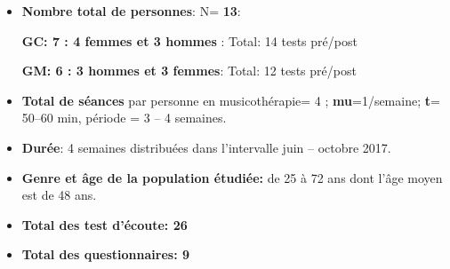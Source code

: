 
















 \begin{itemize}

 \item \textbf{Nombre total de personnes}: N=  \textbf{13}:

\textbf{GC: 7 : 4 femmes et 3 hommes} : Total: 14 tests pré/post
 	
\textbf{	GM: 6 : 3 hommes et 3 femmes}: Total: 12 tests pré/post
\item \textbf{Total de séances} par personne en
   musicothérapie= 4 ;   \textbf{mu}=1/semaine;
 \textbf{t}= 50--60 min, période = 3 -- 4 semaines.
  \item\textbf{Durée}: 4 semaines distribuées dans l'intervalle juin -- octobre 2017.
 \item\textbf{Genre et âge de la population étudiée:}  de 25 à 72
 ans dont l'âge moyen est de 48 ans.
 \item\textbf{Total  des test d'écoute: 26}
 \item\textbf{Total des questionnaires: 9}
\end{itemize}


